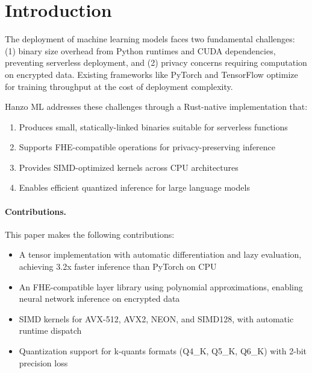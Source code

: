 \section{Introduction}


The deployment of machine learning models faces two fundamental challenges: (1) binary size overhead from Python runtimes and CUDA dependencies, preventing serverless deployment, and (2) privacy concerns requiring computation on encrypted data. Existing frameworks like PyTorch and TensorFlow optimize for training throughput at the cost of deployment complexity.

Hanzo ML addresses these challenges through a Rust-native implementation that:
\begin{enumerate}
    \item Produces small, statically-linked binaries suitable for serverless functions
    \item Supports FHE-compatible operations for privacy-preserving inference
    \item Provides SIMD-optimized kernels across CPU architectures
    \item Enables efficient quantized inference for large language models
\end{enumerate}

\paragraph{Contributions.} This paper makes the following contributions:
\begin{itemize}
    \item A tensor implementation with automatic differentiation and lazy evaluation, achieving 3.2x faster inference than PyTorch on CPU
    \item An FHE-compatible layer library using polynomial approximations, enabling neural network inference on encrypted data
    \item SIMD kernels for AVX-512, AVX2, NEON, and SIMD128, with automatic runtime dispatch
    \item Quantization support for k-quants formats (Q4\_K, Q5\_K, Q6\_K) with 2-bit precision loss
\end{itemize}

